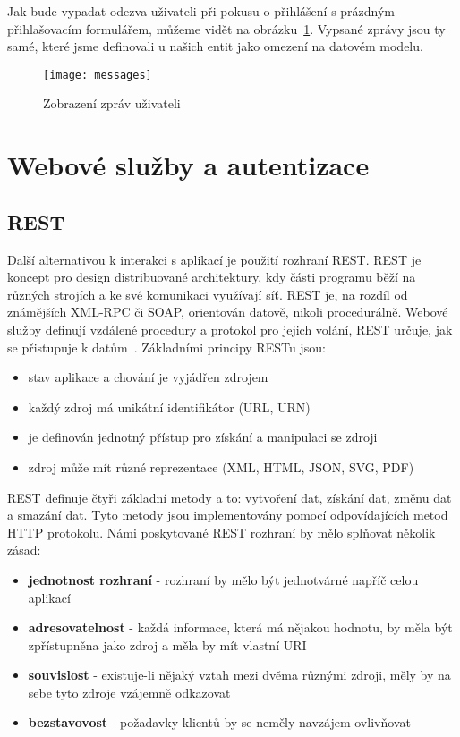 \documentclass[122pt,oneside]{fithesis}
\begin{document}
Jak bude vypadat odezva uživateli při pokusu o přihlášení s prázdným přihlašovacím formulářem, můžeme vidět na obrázku~\ref{img:messages}. Vypsané zprávy jsou ty samé, které jsme definovali u našich entit jako omezení na datovém modelu.  

\begin{figure}[!ht]
\centering
\texttt{[image: messages]}
\caption{Zobrazení zpráv uživateli}
\label{img:messages}
\end{figure}

\chapter{Webové služby a autentizace}
\section{REST}
\label{rest}
Další alternativou k interakci s aplikací je použití rozhraní REST. REST je koncept pro design distribuované architektury, kdy části programu běží na různých strojích a ke své komunikaci využívají síť. REST je, na rozdíl od známějších XML-RPC či SOAP, orientován datově, nikoli procedurálně. Webové služby definují vzdálené procedury a protokol pro jejich volání, REST určuje, jak se přistupuje k datům~\cite{maly09}. Základními principy RESTu jsou:

\begin{itemize}
  \item stav aplikace a chování je vyjádřen zdrojem
  \item každý zdroj má unikátní identifikátor (URL, URN)
  \item je definován jednotný přístup pro získání a manipulaci se zdroji
  \item zdroj může mít různé reprezentace (XML, HTML, JSON, SVG, PDF)
\end{itemize}

REST definuje čtyři základní metody a to: vytvoření dat, získání dat, změnu dat a smazání dat. Tyto metody jsou implementovány pomocí odpovídajících metod HTTP protokolu. Námi poskytované REST rozhraní by mělo splňovat několik zásad:

\begin{itemize}
  \item {\bf jednotnost rozhraní} - rozhraní by mělo být jednotvárné napříč celou aplikací
  \item {\bf adresovatelnost} - každá informace, která má nějakou hodnotu, by měla být zpřístupněna jako zdroj a měla by mít vlastní URI
  \item {\bf souvislost} - existuje-li nějaký vztah mezi dvěma různými zdroji, měly by na sebe tyto zdroje vzájemně odkazovat
  \item {\bf bezstavovost} - požadavky klientů by se neměly navzájem ovlivňovat 
\end{itemize}
\end{document}
